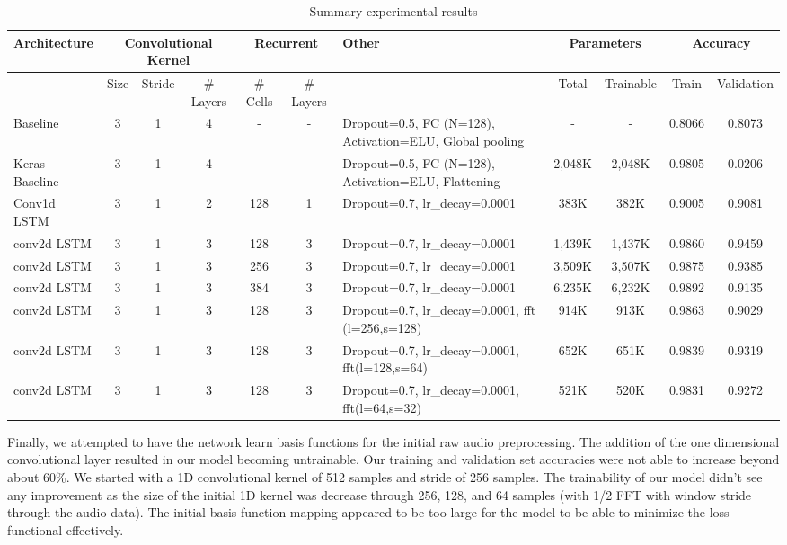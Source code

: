 \documentclass{article}
\begin{document}
\begin{table}[!htbp]
  \resizebox{\textwidth}{!} {
    \begin{tabular} { |m{2.5cm}|c|c|c|c|c|m{5cm}|c|c|c|c| }
      \hline
      Architecture & \multicolumn{3}{|c|}{Convolutional Kernel} &
      \multicolumn{2}{|c|}{Recurrent} & Other &
      \multicolumn{2}{|c|}{Parameters} & \multicolumn{2}{|c|}{Accuracy} \\
      \hline
      & Size & Stride & \# Layers &
      \# Cells & \# Layers & &
      Total & Trainable & Train & Validation \\ \hline
      \hline
      Baseline & 3 & 1 & 4 &
      - & - & Dropout=0.5, FC (N=128), Activation=ELU, Global pooling &
      - & - & 0.8066 & 0.8073 \\ \hline
      \hline
      Keras Baseline & 3 & 1 & 4 &
      - & - & Dropout=0.5, FC (N=128), Activation=ELU, Flattening &
      2,048K & 2,048K & 0.9805 & 0.0206 \\ \hline
      \hline
      Conv1d LSTM & 3 & 1 & 2 &
      128 & 1 & Dropout=0.7, lr\_decay=0.0001 &
      383K & 382K & 0.9005 & 0.9081 \\ \hline
      \hline
      conv2d LSTM & 3 & 1 & 3 &
      128 & 3 & Dropout=0.7, lr\_decay=0.0001 &
      1,439K & 1,437K & 0.9860 & 0.9459 \\ \hline
      \hline
      conv2d LSTM & 3 & 1 & 3 &
      256 & 3 & Dropout=0.7, lr\_decay=0.0001 &
      3,509K & 3,507K & 0.9875 & 0.9385 \\ \hline
      conv2d LSTM & 3 & 1 & 3 &
      384 & 3 & Dropout=0.7, lr\_decay=0.0001 &
      6,235K & 6,232K & 0.9892 & 0.9135 \\ \hline
      \hline
      conv2d LSTM & 3 & 1 & 3 &
      128 & 3 & Dropout=0.7, lr\_decay=0.0001,
      fft (l=256,s=128) &
      914K & 913K & 0.9863 & 0.9029 \\ \hline
      conv2d LSTM & 3 & 1 & 3 &
      128 & 3 & Dropout=0.7, lr\_decay=0.0001,
      fft(l=128,s=64) &
      652K & 651K & 0.9839 & 0.9319 \\ \hline
      conv2d LSTM & 3 & 1 & 3 &
      128 & 3 & Dropout=0.7, lr\_decay=0.0001,
      fft(l=64,s=32) &
      521K & 520K & 0.9831 & 0.9272 \\ \hline
    \end{tabular}
  }
  \caption{Summary experimental results}
  \label{tab:summary-results}
\end{table}

Finally, we attempted to have the network learn basis functions for
the initial raw audio preprocessing. The addition of the one
dimensional convolutional layer resulted in our model becoming
untrainable. Our training and validation set accuracies were not able
to increase beyond about 60\%. We started with a 1D convolutional
kernel of 512 samples and stride of 256 samples. The trainability of
our model didn't see any improvement as the size of the initial 1D
kernel was decrease through 256, 128, and 64 samples (with 1/2 FFT
with window stride through the audio data). The initial basis function
mapping appeared to be too large for the model to be able to minimize
the loss functional effectively.
\end{document}
